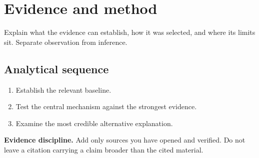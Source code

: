 \section{Evidence and method}\label{sec:evidence}

Explain what the evidence can establish, how it was selected, and where its
limits sit. Separate observation from inference.

\subsection{Analytical sequence}

\begin{enumerate}
  \item Establish the relevant baseline.
  \item Test the central mechanism against the strongest evidence.
  \item Examine the most credible alternative explanation.
\end{enumerate}

\begin{sidenote}
\textbf{Evidence discipline.} Add only sources you have opened and verified.
Do not leave a citation carrying a claim broader than the cited material.
\end{sidenote}

